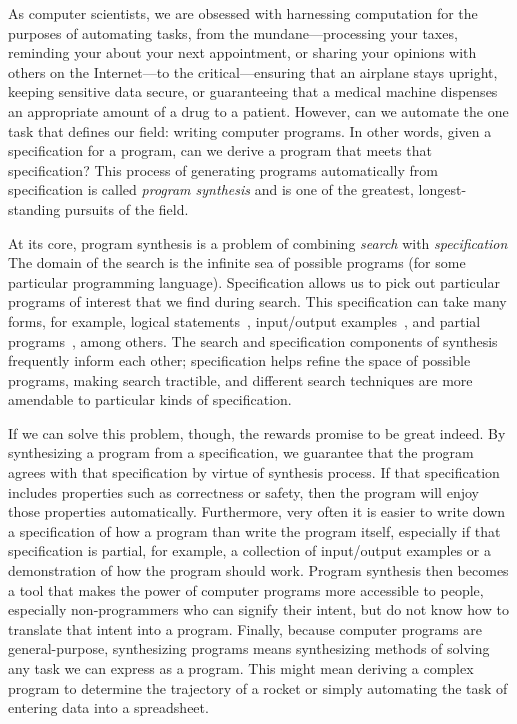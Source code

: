 As computer scientists, we are obsessed with harnessing computation for the purposes of automating tasks, from the mundane---processing your taxes, reminding your about your next appointment, or sharing your opinions with others on the Internet---to the critical---ensuring that an airplane stays upright, keeping sensitive data secure, or guaranteeing that a medical machine dispenses an appropriate amount of a drug to a patient.
However, can we automate the one task that defines our field: writing computer programs.
In other words, given a specification for a program, can we derive a program that meets that specification?
This process of generating programs automatically from specification is called \emph{program synthesis} and is one of the greatest, longest-standing pursuits of the field.

At its core, program synthesis is a problem of combining \emph{search} with \emph{specification}
The domain of the search is the infinite sea of possible programs (for some particular programming language).
Specification allows us to pick out particular programs of interest that we find during search.
This specification can take many forms, for example, logical statements~\citep{green-ijcai-1969, manna-tse-1979}, input/output examples~\citep{summers-popl-1976, kitzelmann-thesis-2010, albarghouthi-cav-2013, feser-pldi-2015}, and partial programs~\citep{solar-lezama-thesis-2008, alur-fmcad-2013, singh-pldi-2013}, among others.
The search and specification components of synthesis frequently inform each other; specification helps refine the space of possible programs, making search tractible, and different search techniques are more amendable to particular kinds of specification.

If we can solve this problem, though, the rewards promise to be great indeed.
By synthesizing a program from a specification, we guarantee that the program agrees with that specification by virtue of synthesis process.
If that specification includes properties such as correctness or safety, then the program will enjoy those properties automatically.
Furthermore, very often it is easier to write down a specification of how a program than write the program itself, especially if that specification is partial, for example, a collection of input/output examples or a demonstration of how the program should work.
Program synthesis then becomes a tool that makes the power of computer programs more accessible to people, especially non-programmers who can signify their intent, but do not know how to translate that intent into a program.
Finally, because computer programs are general-purpose, synthesizing programs means synthesizing methods of solving any task we can express as a program.
This might mean deriving a complex program to determine the trajectory of a rocket or simply automating the task of entering data into a spreadsheet.

